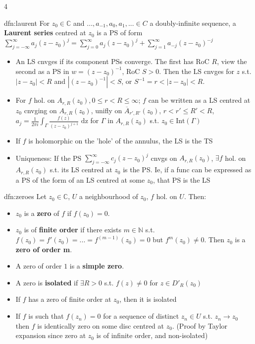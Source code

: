 \documentclass[landscape, 8pt]{extarticle}
\begin{document}
\begin{multicols*}{4}
		
		\begin{dfn}{dfn:laurent}{ }
			For $z_0 \in \mathbb{C}$ and $..., a_{-1}, a_0, a_1, ... \in C$ a doubly-infinite sequence, a \textbf{Laurent series} centred at $z_0$ is a PS of form $\sum_{j= -\infty}^{\infty}a_j(z-z_0)^j = \sum_{j=0}^{\infty}a_j(z-z_0)^j + \sum_{j=1}^{\infty}a_{-j}(z-z_0)^{-j}$
			\begin{itemize}
				\item An LS cnvges if its component PSs converge. The first has RoC $R$, view the second as a PS in $w = (z-z_0)^{-1}$, RoC $S >0$. Then the LS cnvges for $z$ s.t. $\left|z-z_0\right| <R$ and $\left|(z-z_0)^{-1}\right| <S$, or $S^{-1} = r < \left|z-z_0\right| < R$.
				\item For $f$ hol. on $A_{r, R}(z_0), 0 \le r < R \le \infty$;
				$f$ can be written as a LS centred at $z_0$ cnvging on $A_{r, R}(z_0)$,
				unifly on $\overline{A}_{r', R'}(z_0)$, $r < r' \le R' < R$, $a_j = \frac{1}{2 \pi i} \int_{\Gamma}\frac{f(z)}{(z-z_0)^{j+1}} \text{ dz}$ for $\Gamma$ in $A_{r, R}(z_0)$ s.t. $z_0 \in \text{Int}(\Gamma)$
				\item If $f$ is holomorphic on the 'hole' of the annulus, the LS is the TS
				\item Uniqueness: If the PS $\sum_{j= -\infty}^{\infty} c_j (z-z_0)^j$ cnvgs on $A_{r, R}(z_0)$, $\exists f$ hol. on $A_{r, R}(z_0)$ s.t. its LS centred at $z_0$ is the PS. Ie, if a func can be expressed as a PS of the form of an LS centred at some $z_0$, that PS is the LS
			\end{itemize}
			
			
		\end{dfn}
		
		
		\begin{dfn}[Zeroes]{dfn:zeroes}{ }
			Let $z_0 \in \mathbb{C}$, $U$ a neighbourhood of $z_0$, $f$ hol. on $U$. Then:
			\begin{itemize}
				\item[*] $z_0$ is a \textbf{zero} of $f$ if $f(z_0) = 0$.\\
				\item[*] $z_0$ is of \textbf{finite order} if there exists $m \in \mathbb{N}$ s.t. $f(z_0) = f'(z_0) = ... = f^{(m-1)}(z_0) = 0$ but $f^m(z_0) \ne 0$. Then $z_0$ is a \textbf{zero of order m}. 
				\item A zero of order $1$ is a \textbf{simple zero}. 
				\item A zero is \textbf{isolated} if $\exists R> 0$ s.t. $f(z) \ne 0$ for $z \in D'_R(z_0)$
				\item If $f$ has a zero of finite order at $z_0$, then it is isolated
				\item If $f$ is such that $f(z_n) = 0$ for a sequence of distinct $z_n \in U$ s.t. $z_n \to z_0$ then $f$ is identically zero on some disc centred at $z_0$. (Proof by Taylor expansion since zero at $z_0$ is of infinite order, and non-isolated)
			

\end{itemize}
\end{dfn}
\end{multicols*}
\end{document}
